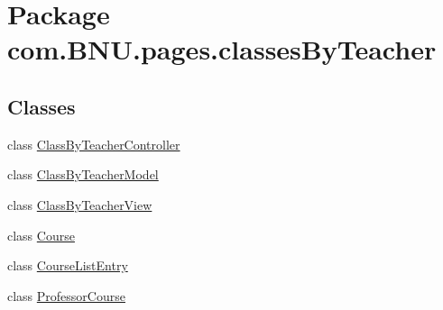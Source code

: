 \hypertarget{namespacecom_1_1_b_n_u_1_1pages_1_1classes_by_teacher}{}\section{Package com.\+B\+N\+U.\+pages.\+classes\+By\+Teacher}
\label{namespacecom_1_1_b_n_u_1_1pages_1_1classes_by_teacher}
\subsection*{Classes}
\begin{DoxyCompactItemize}
\item 
class \mbox{\hyperlink{classcom_1_1_b_n_u_1_1pages_1_1classes_by_teacher_1_1_class_by_teacher_controller}{Class\+By\+Teacher\+Controller}}
\item 
class \mbox{\hyperlink{classcom_1_1_b_n_u_1_1pages_1_1classes_by_teacher_1_1_class_by_teacher_model}{Class\+By\+Teacher\+Model}}
\item 
class \mbox{\hyperlink{classcom_1_1_b_n_u_1_1pages_1_1classes_by_teacher_1_1_class_by_teacher_view}{Class\+By\+Teacher\+View}}
\item 
class \mbox{\hyperlink{classcom_1_1_b_n_u_1_1pages_1_1classes_by_teacher_1_1_course}{Course}}
\item 
class \mbox{\hyperlink{classcom_1_1_b_n_u_1_1pages_1_1classes_by_teacher_1_1_course_list_entry}{Course\+List\+Entry}}
\item 
class \mbox{\hyperlink{classcom_1_1_b_n_u_1_1pages_1_1classes_by_teacher_1_1_professor_course}{Professor\+Course}}
\end{DoxyCompactItemize}
